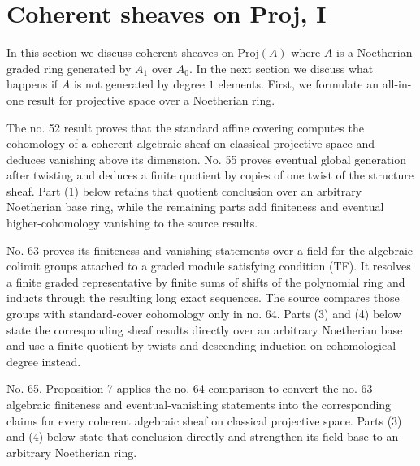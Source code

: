 \section{Coherent sheaves on Proj, I}
\label{section-coherent-proj}

\noindent
In this section we discuss coherent sheaves on $\text{Proj}(A)$
where $A$ is a Noetherian graded ring generated by $A_1$ over $A_0$.
In the next section we discuss what happens if $A$ is not generated
by degree $1$ elements. First, we formulate an all-in-one result for
projective space over a Noetherian ring.

\begin{lemma}
\label{lemma-coherent-projective}
\begin{reference}
\cite[Chapter III, \S 1, no. 52, Proposition 2 and Corollary,
p. 244]{FAC}
\cite[Chapter III, \S 2, no. 55, Theorem 1 and Corollary,
pp. 247--248]{FAC}
\cite[Chapter III, \S 3, no. 63, Proposition 3(b) and (c),
pp. 256--257]{FAC}
\cite[Chapter III, \S 3, no. 65, Proposition 7, p. 258]{FAC}
\cite[Chapter III, \S 5, no. 77, proof of Proposition 4(b),
p. 272]{FAC}
\cite[Chapter III, \S 4, no. 70, biduality observation for
$M=\Gamma(\mathcal F)$, p. 264]{FAC}
\cite[Chapter III, \S 4, no. 72, Corollaries 1 and 2,
p. 267]{FAC}
\end{reference}
\begin{history}
The no. 52 result proves that the standard affine covering computes the
cohomology of a coherent algebraic sheaf on classical projective space and
deduces vanishing above its dimension. No. 55 proves eventual global
generation after twisting and deduces a finite quotient by copies of one
twist of the structure sheaf. Part (1) below retains that quotient conclusion
over an arbitrary Noetherian base ring, while the remaining parts add
finiteness and eventual higher-cohomology vanishing to the source results.

No. 63 proves its finiteness and vanishing statements over a field for the
algebraic colimit groups attached to a graded module satisfying condition
(TF). It resolves a finite graded representative by finite sums of shifts of
the polynomial ring and inducts through the resulting long exact sequences.
The source compares those groups with standard-cover cohomology only in
no. 64. Parts (3) and (4) below state the corresponding sheaf results directly
over an arbitrary Noetherian base and use a finite quotient by twists and
descending induction on cohomological degree instead.

No. 65, Proposition 7 applies the no. 64 comparison to convert the no. 63
algebraic finiteness and eventual-vanishing statements into the corresponding
claims for every coherent algebraic sheaf on classical projective space.
Parts (3) and (4) below state that conclusion directly and strengthen its
field base to an arbitrary Noetherian ring.


\end{history}
\end{lemma}
